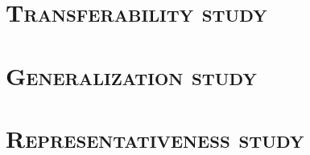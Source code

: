 \minitoc
\section{\textsc{Transferability study}}
    \subsection{\textsc{}}
    \subsection{\textsc{}}
    \subsection{\textsc{}}
\section{\textsc{Generalization study}}
    \subsection{\textsc{}}
    \subsection{\textsc{}}
    \subsection{\textsc{}}
\section{\textsc{Representativeness study}}
    \subsection{\textsc{}}
